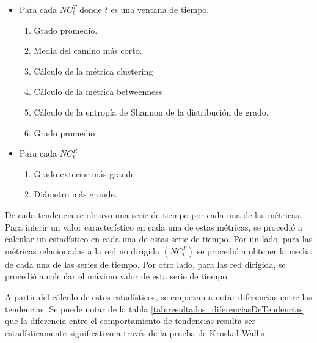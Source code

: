 \documentclass[../main.tex]{subfiles}
\begin{document}
\begin{itemize}
    \item Para cada $NC_{t}^{T}$ donde $t$ es una ventana de tiempo.
    \begin{enumerate}
        \item Grado promedio.
        \item Media del camino más corto.
        \item Cálculo de la métrica clustering
        \item Cálculo de la métrica betweenness %
        \item Cálculo de la entropía de Shannon de la distribución de grado.
        \item Grado promedio
    \end{enumerate}
    \item Para cada $NC_{t}^{R}$
    \begin{enumerate}
        \item Grado exterior más grande.
        \item Diámetro más grande.
    \end{enumerate}
\end{itemize}

De cada tendencia se obtuvo una serie de tiempo por cada una de las métricas. Para inferir un valor característico en cada una de estas métricas, se procedió a calcular un estadístico en cada una de estas serie de tiempo. Por un lado, para las métricas relacionadas a la red no dirigida $(NC_{t}^{T})$ se procedió a obtener la media de cada una de las  series de tiempo. Por otro lado, para las red dirigida, se procedió a calcular el máximo valor de esta serie de tiempo.

A partir del cálculo de estos estadísticos, se empiezan a notar diferencias entre las tendencias. Se puede notar de la tabla \ref{tab:resultados_diferenciasDeTendencias} que la diferencia entre el comportamiento de tendencias resulta ser estadísticamente significativo a través de la prueba de Kruskal-Wallis %
\end{document}
